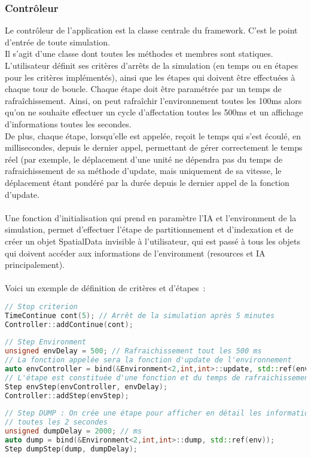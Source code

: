 \subsubsection{Contrôleur}
Le contrôleur de l'application est la classe centrale du framework. C'est le point d'entrée de toute simulation.\\
Il s'agit d'une classe dont toutes les méthodes et membres sont statiques. L'utilisateur définit ses critères d'arrêts de la simulation (en temps ou en étapes pour les critères implémentés), ainsi que les étapes qui doivent être effectuées à chaque tour de boucle. Chaque étape doit être paramétrée par un temps de rafraîchissement. Ainsi, on peut rafraîchir l'environnement toutes les 100ms alors qu'on ne souhaite effectuer un cycle d'affectation toutes les 500ms et un affichage d'informations toutes les secondes.\\
De plus, chaque étape, lorsqu'elle est appelée, reçoit le temps qui s'est écoulé, en millisecondes, depuis le dernier appel, permettant de gérer correctement le temps réel (par exemple, le déplacement d'une unité ne dépendra pas du temps de rafraichissement de sa méthode d'update, mais uniquement de sa vitesse, le déplacement étant pondéré par la durée depuis le dernier appel de la fonction d'update.\\\\

Une fonction d'initialisation qui prend en paramètre l'IA et l'environment de la simulation, permet d'effectuer l'étape de partitionnement et d'indexation et de créer un objet SpatialData invisible à l'utilisateur, qui est passé à tous les objets qui doivent accéder aux informations de l'environment (resources et IA principalement).\\\\
Voici un exemple de définition de critères et d'étapes~:

\begin{lstlisting}[label=nvi_code,caption=Paramètres du contrôleur,language=C++]
// Stop criterion
TimeContinue cont(5); // Arrêt de la simulation après 5 minutes
Controller::addContinue(cont);
        
// Step Environment
unsigned envDelay = 500; // Rafraichissement tout les 500 ms
// La fonction appelée sera la fonction d'update de l'environnement
auto envController = bind(&Environment<2,int,int>::update, std::ref(env), placeholders::_1);
// L'étape est constituée d'une fonction et du temps de rafraichissement
Step envStep(envController, envDelay);
Controller::addStep(envStep);
        
// Step DUMP : On crée une étape pour afficher en détail les informations de l'environnement
// toutes les 2 secondes
unsigned dumpDelay = 2000; // ms
auto dump = bind(&Environment<2,int,int>::dump, std::ref(env));
Step dumpStep(dump, dumpDelay);
\end{lstlisting}

